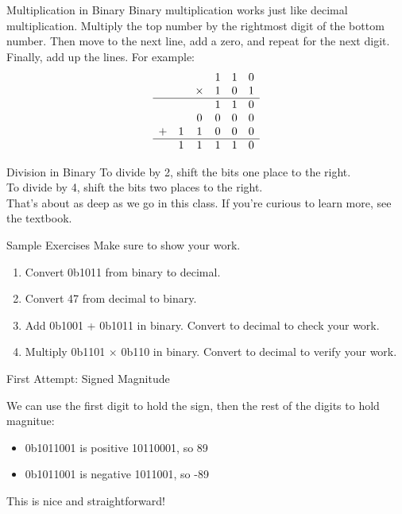 \begin{frame}{Multiplication in Binary}
Binary multiplication works just like decimal multiplication. 
Multiply the top number by the rightmost digit of the bottom number.
Then move to the next line, add a zero, and repeat for the next digit.
Finally, add up the lines. For example:
\[
\begin{array}{cccccc}
        &   &        & 1 & 1 & 0 \\ 
        &   & \times & 1 & 0 & 1 \\
    \hline
        &   &        & 1 & 1 & 0 \\ 
        &   & 0      & 0 & 0 & 0 \\
        + & 1 & 1      & 0 & 0 & 0 \\
        \hline 
        & 1 & 1      & 1 & 1 & 0 \\
\end{array}
\]
\end{frame}


\begin{frame}{Division in Binary}
To divide by 2, shift the bits one place to the right. \\

To divide by 4, shift the bits two places to the right. \\

That's about as deep as we go in this class. If you're curious to learn more, see the textbook.

\end{frame}

\begin{frame}{Sample Exercises}
Make sure to show your work.
\vfill 
\begin{enumerate}
    \item Convert 0b1011 from binary to decimal. 
    \vfill
    \item Convert 47 from decimal to binary.
    \vfill
    \item Add 0b1001 + 0b1011 in binary. Convert to decimal to check your work.
    \vfill
    \item Multiply 0b1101 $\times$ 0b110 in binary. Convert to decimal to verify your work.
    \vfill 
\end{enumerate}
\end{frame}


\begin{frame}{First Attempt: Signed Magnitude}

We can use the first digit to hold the sign, then the rest of the digits to hold magnitue:

    \begin{itemize}
        \item 0b1011001 is positive 10110001, so 89
        \item 0b1011001 is negative 1011001, so -89 
    \end{itemize}

This is nice and straightforward!

\end{frame}


